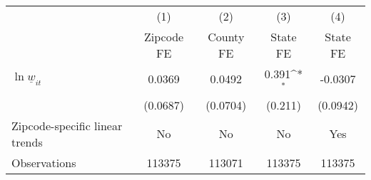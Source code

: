 {
\def\sym#1{\ifmmode^{#1}\else\(^{#1}\)\fi}
\begin{tabular}{l*{4}{c}}
\hline\hline
          &\multicolumn{1}{c}{(1)}&\multicolumn{1}{c}{(2)}&\multicolumn{1}{c}{(3)}&\multicolumn{1}{c}{(4)}\\
          &\multicolumn{1}{c}{Zipcode FE}&\multicolumn{1}{c}{County FE}&\multicolumn{1}{c}{State FE}&\multicolumn{1}{c}{State FE}\\
\hline
$\ln \underline{w}_{it}$&   0.0369         &   0.0492         &    0.391\sym{*}  &  -0.0307         \\
          & (0.0687)         & (0.0704)         &  (0.211)         & (0.0942)         \\
\hline
Zipcode-specific linear trends&       No         &       No         &       No         &      Yes         \\
Observations&   113375         &   113071         &   113375         &   113375         \\
\hline\hline
\end{tabular}
}

